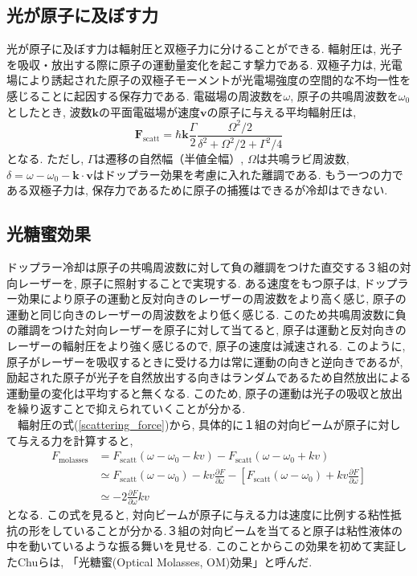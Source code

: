 \documentclass[uplatex, dvipdfmx, a4paper, report, papersize, 11pt]{jsbook}
\begin{document}
\subsection{光が原子に及ぼす力}
 光が原子に及ぼす力は輻射圧と双極子力に分けることができる. 輻射圧は, 光子を吸収・放出する際に原子の運動量変化を起こす撃力である\cite{ノーベル賞と分光学}. 双極子力は, 光電場により誘起された原子の双極子モーメントが光電場強度の空間的な不均一性を感じることに起因する保存力である\cite{気体原子のレーザー冷却}.
 電磁場の周波数を$\omega$, 原子の共鳴周波数を$\omega_0$としたとき, 波数$\bm k$の平面電磁場が速度$\bm v$の原子に与える平均輻射圧は,
 \begin{equation}\label{scattering_force}
\bm{F} _ { \mathrm { scatt } } = \hbar \bm{k}\frac { \Gamma } { 2 } \frac { \Omega ^ { 2 } / 2 } { \delta ^ { 2 } + \Omega ^ { 2 } / 2 + \Gamma ^ { 2 } / 4 }
 \end{equation}
となる\cite{Foot:1080846}. ただし, $\Gamma$は遷移の自然幅（半値全幅）, $\Omega$は共鳴ラビ周波数, $\delta = \omega - \omega _ { 0 } - \bm{k} \cdot \bm{v}$はドップラー効果を考慮に入れた離調である. もう一つの力である双極子力は, 保存力であるために原子の捕獲はできるが冷却はできない\cite{ノーベル賞と分光学}.

\subsection{光糖蜜効果}
ドップラー冷却は原子の共鳴周波数に対して負の離調をつけた直交する３組の対向レーザーを, 原子に照射することで実現する. ある速度をもつ原子は, ドップラー効果により原子の運動と反対向きのレーザーの周波数をより高く感じ, 原子の運動と同じ向きのレーザーの周波数をより低く感じる. このため共鳴周波数に負の離調をつけた対向レーザーを原子に対して当てると, 原子は運動と反対向きのレーザーの輻射圧をより強く感じるので, 原子の速度は減速される. このように, 原子がレーザーを吸収するときに受ける力は常に運動の向きと逆向きであるが, 励起された原子が光子を自然放出する向きはランダムであるため自然放出による運動量の変化は平均すると無くなる. このため, 原子の運動は光子の吸収と放出を繰り返すことで抑えられていくことが分かる.\\
　輻射圧の式(\ref{scattering_force})から, 具体的に１組の対向ビームが原子に対して与える力を計算すると,
\begin{equation}
  \begin{split}
    F _ { \mathrm{molasses} } &= F _ { \mathrm{scatt}  } \left( \omega - \omega _ { 0 } - k v \right) - F _ {  \mathrm{scatt} }  \left( \omega - \omega _ { 0 } + k v \right)
    \\& \simeq F _ { \mathrm{scatt}  } \left( \omega - \omega _ { 0 } \right) - k v \frac { \partial F } { \partial \omega } - \left[ F _ {  \mathrm{scatt} } \left( \omega - \omega _ { 0 } \right) + k v \frac { \partial F } { \partial \omega } \right]
    \\& \simeq - 2 \frac { \partial F } { \partial \omega } k v
  \end{split}
\end{equation}
となる. この式を見ると, 対向ビームが原子に与える力は速度に比例する粘性抵抗の形をしていることが分かる.３組の対向ビームを当てると原子は粘性液体の中を動いているような振る舞いを見せる. このことからこの効果を初めて実証したChuらは, 「光糖蜜(Optical Molasses,  OM)効果」と呼んだ.
\end{document}
